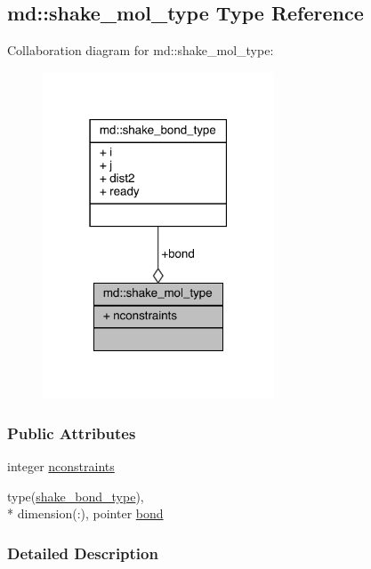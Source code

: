 \hypertarget{structmd_1_1shake__mol__type}{\subsection{md\-:\-:shake\-\_\-mol\-\_\-type Type Reference}
\label{structmd_1_1shake__mol__type}
}


Collaboration diagram for md\-:\-:shake\-\_\-mol\-\_\-type\-:
\nopagebreak
\begin{figure}[H]
\begin{center}
\leavevmode
\includegraphics[width=195pt]{structmd_1_1shake__mol__type__coll__graph}
\end{center}
\end{figure}
\subsubsection*{Public Attributes}
\begin{DoxyCompactItemize}
\item 
integer \hyperlink{structmd_1_1shake__mol__type_ae21a429532ad510859b583b27f3a6b14}{nconstraints}
\item 
type(\hyperlink{structmd_1_1shake__bond__type}{shake\-\_\-bond\-\_\-type}), \\*
dimension(\-:), pointer \hyperlink{structmd_1_1shake__mol__type_ad29ab1345861fdf94b3f776eb46a5478}{bond}
\end{DoxyCompactItemize}


\subsubsection{Detailed Description}


